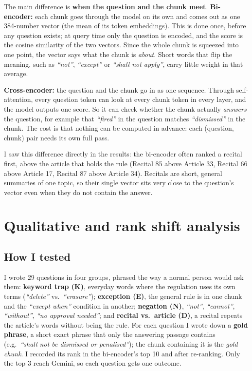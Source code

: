 \documentclass[10pt,a4paper]{article}
\newcommand{\q}[1]{\textit{``#1''}}
\begin{document}
The main difference is \textbf{when the question and the chunk meet}.
\textbf{Bi-encoder:} each chunk goes through the model on its own and comes out as one 384-number vector (the mean of its token embeddings).
This is done once, before any question exists; at query time only the question is encoded, and the score is the cosine similarity of the two vectors.
Since the whole chunk is squeezed into one point, the vector says what the chunk is \emph{about}.
Short words that flip the meaning, such as \q{not}, \q{except} or \q{shall not apply}, carry little weight in that average.

\textbf{Cross-encoder:} the question and the chunk go in as one sequence.
Through self-attention, every question token can look at every chunk token in every layer, and the model outputs one score.
So it can check whether the chunk actually \emph{answers} the question, for example that \q{fired} in the question matches \q{dismissed} in the chunk.
The cost is that nothing can be computed in advance: each (question, chunk) pair needs its own full pass.

I saw this difference directly in the results: the bi-encoder often ranked a recital first, above the article that holds the rule (Recital 85 above Article 33, Recital 66 above Article 17, Recital 87 above Article 34).
Recitals are short, general summaries of one topic, so their single vector sits very close to the question's vector even when they do not contain the answer.

\section{Qualitative and rank shift analysis}

\subsection{How I tested}
I wrote 29 questions in four groups, phrased the way a normal person would ask them:
\textbf{keyword trap (K)}, everyday words where the regulation uses its own terms (\q{delete} vs.\ \q{erasure});
\textbf{exception (E)}, the general rule is in one chunk and the \q{except when} condition in another;
\textbf{negation (N)}, \q{not}, \q{cannot}, \q{without}, \q{no approval needed};
and \textbf{recital vs.\ article (D)}, a recital repeats the article's words without being the rule.
For each question I wrote down a \textbf{gold phrase}, a short exact phrase that only the answering passage contains (e.g.\ \q{shall not be dismissed or penalised}); the chunk containing it is the \emph{gold chunk}.
I recorded its rank in the bi-encoder's top 10 and after re-ranking. Only the top 3 reach Gemini, so each question gets one outcome.
\end{document}
